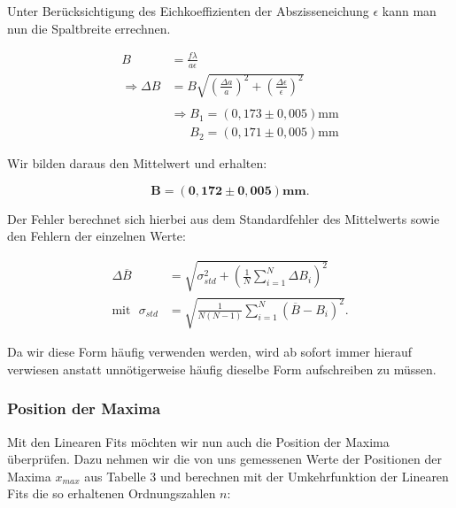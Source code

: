 \documentclass{article}
\begin{document}
Unter Berücksichtigung des Eichkoeffizienten der Abszisseneichung $\epsilon$ kann man nun die Spaltbreite errechnen.

\begin{equation}
    \begin{split}
        B &= \frac{f \lambda}{a \epsilon} \\
        \Rightarrow \Delta B &= B \sqrt{\left( \frac{\Delta a}{a} \right)^2 + \left( \frac{\Delta \epsilon}{\epsilon} \right)^2} \\ \\
        &\Rightarrow B_1 = (0,173 \pm 0,005)\text{mm} \\
        &\phantom{\Rightarrow} B_2 = (0,171 \pm 0,005)\text{mm}
    \end{split}
\end{equation}

Wir bilden daraus den Mittelwert und erhalten:

\begin{equation}
    \bm{B = (0,172 \pm 0,005)} \textbf{mm}.
\end{equation}

Der Fehler berechnet sich hierbei aus dem Standardfehler des Mittelwerts sowie den Fehlern der einzelnen Werte: 

\begin{equation}
    \begin{split}
        \Delta \overline{B} &= \sqrt{\sigma_{std}^2 + \left( \frac{1}{N} \sum_{i=1}^N \Delta B_i \right)^2} \\
        \text{mit} \ \ \ \sigma_{std} &= \sqrt{\frac{1}{N(N-1)} \sum_{i=1}^N (\overline{B} - B_i)^2}.
    \end{split}
    \label{eq:FEHLER_MW}
\end{equation}

Da wir diese Form häufig verwenden werden, wird ab sofort immer hierauf verwiesen anstatt unnötigerweise häufig dieselbe Form aufschreiben zu müssen. 

\subsubsection{Position der Maxima}

Mit den Linearen Fits möchten wir nun auch die Position der Maxima überprüfen. Dazu nehmen wir die von uns gemessenen Werte der Positionen der Maxima $x_{max}$ aus Tabelle 3 und berechnen mit der Umkehrfunktion der Linearen Fits die so erhaltenen Ordnungszahlen $n$:
\end{document}

